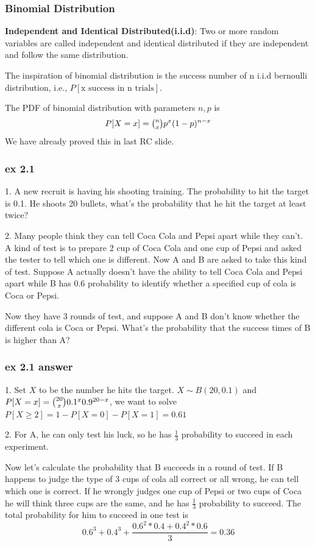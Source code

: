 \documentclass{beamer}
\begin{document}
\begin{frame}
    \frametitle{Binomial Distribution}
    \textbf{Independent and Identical Distributed(i.i.d)}: Two or more random variables are called independent and identical distributed if they are independent and follow the same distribution.\par
    The inspiration of binomial distribution is the success number of n i.i.d bernoulli distribution, i.e., $P[\text{x success in n trials}]$.\par
    The PDF of binomial distribution with parameters $n, p$ is 
    \[P[X=x]=\tbinom{n}{x}p^{x}(1-p)^{n-x}\]
    We have already proved this in last RC slide.\par
\end{frame}


\begin{frame}
    \frametitle{ex 2.1}
    1. A new recruit is having his shooting training. The probability to hit the target is 0.1. He shoots 20 bullets, what's the probability that he hit the target at least twice?\par
    \vspace{0.3cm}
    2. Many people think they can tell Coca Cola and Pepsi apart while they can't. A kind of test is to prepare 2 cup of Coca Cola and one cup of Pepsi and asked the tester to tell which one is different. Now A and B are asked to take this kind of test. Suppose A actually doesn't have the ability to tell Coca Cola and Pepsi apart while B has 0.6 probability to identify whether a specified cup of cola is Coca or Pepsi.\par
    Now they have 3 rounds of test, and suppose A and B don't know whether the different cola is Coca or Pepsi. What's the probability that the success times of B is higher than A?
    
    
\end{frame}


\begin{frame} 
    \frametitle{ex 2.1 answer}
    1. Set $X$ to be the number he hits the target. $X\sim B(20, 0.1)$ and $P[X=x]=\tbinom{20}{x}0.1^x 0.9^{20-x}$, we want to solve $P[X\geq 2]=1-P[X=0]-P[X=1]=0.61$\par
    \vspace{0.3cm}
    2. For A, he can only test his luck, so he has $\frac{1}{3}$ probability to succeed in each experiment.\par
    Now let's calculate the probability that B succeeds in a round of test. If B happens to judge the type of 3 cups of cola all correct or all wrong, he can tell which one is correct. If he wrongly judges one cup of Pepsi or two cups of Coca he will think three cups are the same, and he has $\frac{1}{3}$ probability to succeed. The total probability for him to succeed in one test is 
    \[0.6^3+0.4^3+\frac{0.6^2*0.4+0.4^2*0.6}{3}=0.36\]

\end{frame}
\end{document}

